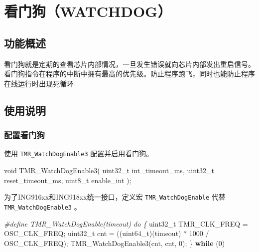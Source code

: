 \documentclass[
  12pt,
]{book}
\newenvironment{Shaded}{\begin{snugshade}}{\end{snugshade}}
\newcommand{\ControlFlowTok}[1]{\textcolor[rgb]{0.13,0.29,0.53}{\textbf{#1}}}
\newcommand{\DataTypeTok}[1]{\textcolor[rgb]{0.13,0.29,0.53}{#1}}
\newcommand{\DecValTok}[1]{\textcolor[rgb]{0.00,0.00,0.81}{#1}}
\newcommand{\NormalTok}[1]{#1}
\newcommand{\PreprocessorTok}[1]{\textcolor[rgb]{0.56,0.35,0.01}{\textit{#1}}}
\begin{document}
\hypertarget{ch-watchdog}{%
\chapter{看门狗（WATCHDOG）}\label{ch-watchdog}}

\hypertarget{ux529fux80fdux6982ux8ff0-9}{%
\section{功能概述}\label{ux529fux80fdux6982ux8ff0-9}}

看门狗就是定期的查看芯片内部情况，一旦发生错误就向芯片内部发出重启信号。
看门狗指令在程序的中断中拥有最高的优先级。防止程序跑飞，同时也能防止程序在线运行时出现死循环

\hypertarget{ux4f7fux7528ux8bf4ux660e-10}{%
\section{使用说明}\label{ux4f7fux7528ux8bf4ux660e-10}}

\hypertarget{ux914dux7f6eux770bux95e8ux72d7}{%
\subsection{配置看门狗}\label{ux914dux7f6eux770bux95e8ux72d7}}

使用 \texttt{TMR\_WatchDogEnable3} 配置并启用看门狗。

\begin{Shaded}
\begin{Highlighting}[]
\DataTypeTok{void}\NormalTok{ TMR_WatchDogEnable3(}
  \DataTypeTok{uint32_t}\NormalTok{ int_timeout_ms, }
  \DataTypeTok{uint32_t}\NormalTok{ reset_timeout_ms, }
  \DataTypeTok{uint8_t}\NormalTok{ enable_int}
\NormalTok{  );}
\end{Highlighting}
\end{Shaded}

为了ING916xx和ING918xx统一接口，定义宏 \texttt{TMR\_WatchDogEnable} 代替 \texttt{TMR\_WatchDogEnable3} 。

\begin{Shaded}
\begin{Highlighting}[]
\PreprocessorTok{#define TMR_WatchDogEnable(timeout) do \{ }
  \DataTypeTok{uint32_t}\NormalTok{ TMR_CLK_FREQ = OSC_CLK_FREQ; }
  \DataTypeTok{uint32_t}\NormalTok{ cnt = ((}\DataTypeTok{uint64_t}\NormalTok{)(timeout) * }\DecValTok{1000}\NormalTok{ / OSC_CLK_FREQ); }
\NormalTok{  TMR_WatchDogEnable3(cnt, cnt, }\DecValTok{0}\NormalTok{); }
\NormalTok{  \} }\ControlFlowTok{while}\NormalTok{ (}\DecValTok{0}\NormalTok{)}
\end{Highlighting}
\end{Shaded}
\end{document}
